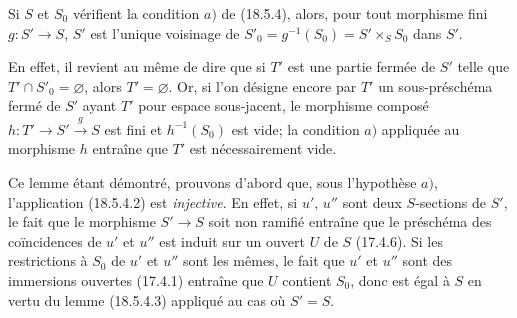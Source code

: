 \begin{lemma}[18.5.4.3]
\label{IV.18.5.4.3}
Si $S$ et $S_0$ vérifient la condition $a)$ de (18.5.4), alors, pour tout morphisme fini $g:S'\to S$, $S'$ est l'unique voisinage de $S'_0=g^{-1}(S_0)=S'\times_S S_0$ dans $S'$.
\end{lemma}

En effet, il revient au même de dire que si $T'$ est une partie fermée de $S'$ telle que $T'\cap S'_0=\varnothing$, alors $T'=\varnothing$. Or, si l'on désigne encore par $T'$ un sous-préschéma fermé de $S'$ ayant $T'$ pour espace sous-jacent, le morphisme composé $h:T'\to S'\xrightarrow{g}S$ est fini et $h^{-1}(S_0)$ est vide; la condition $a)$ appliquée au morphisme $h$ entraîne que $T'$ est nécessairement vide.

Ce lemme étant démontré, prouvons d'abord que, sous l'hypothèse $a)$, l'application (18.5.4.2) est \emph{injective}. En effet, si $u'$, $u''$ sont deux $S$-sections de $S'$, le fait que le morphisme $S'\to S$ soit non ramifié entraîne que le préschéma des coïncidences de $u'$ et $u''$ est induit sur un ouvert $U$ de $S$ (17.4.6). Si les restrictions à $S_0$ de $u'$ et $u''$ sont les mêmes, le fait que $u'$ et $u''$ sont des immersions ouvertes (17.4.1) entraîne que $U$ contient $S_0$, donc est égal à $S$ en vertu du lemme (18.5.4.3) appliqué au cas où $S'=S$.


